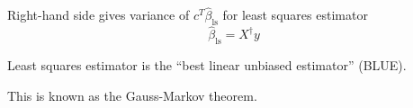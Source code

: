 \begin{corollary}
    Right-hand side gives variance of $ c^{T} \hat{\beta}_{\mathrm{ls}} $ for least squares estimator
\begin{equation}
\hat{\beta}_{\mathrm{ls}}=X^{\dagger} y
\end{equation}
\end{corollary}

\begin{theorem}
    Least squares estimator is the ``best linear unbiased estimator'' (BLUE).
\end{theorem}

This is known as the Gauss-Markov theorem.

